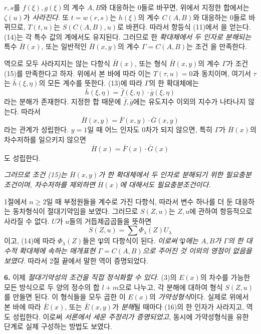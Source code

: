 \(r,s\)를 \(f(\xi),g(\xi)\)의 계수 \(A,B\)와 대응하는 0들로 바꾸면, 위에서 지정한 합에서는 \(\zeta(u)\)가 \emph{사라진다}. 또 \(t=w(r,s)\)는 \(h(\xi)\)의 계수 \(C(A,B)\)와 대응하는 0들로 바뀌므로, \(T(t,u)\)는 \(S(C(A,B),u)\)로 바뀐다. 따라서 항등식 (11)에서
을 얻는다. (14)는 각 특수 값의 계에서도 유지된다. 그러므로 한 \emph{확대체에서 두 인자로 분해되는} 특수 \(\bar H(x)\), 또는 일반적인 \(\bar H(x,y)\)의 계수 \(\Gamma=C(A,B)\)는 조건
을 만족한다.

역으로 모두 사라지지는 않는 다항식 \(\bar H(x)\), 또는 형식 \(\bar H(x,y)\)의 계수 \(\Gamma\)가 조건 (15)를 만족한다고 하자. 위에서 본 바에 따라 이는 \(T(\tau,u)=0\)과 동치이며, 여기서 \(\tau\)는 \(\bar h(\xi,\eta)\)의 모든 계수를 뜻한다. (13)에 따라 \(\Gamma\)의 한 확대체에는
\[
\bar h(\xi,\eta)=\bar f(\xi,\eta)\cdot\bar g(\xi,\eta)
\]
라는 분해가 존재한다. 지정한 합 때문에 \(\bar f,\bar g\)에는 유도지수 이외의 지수가 나타나지 않는다. 따라서
\[
\bar H(x,y)=\bar F(x,y)\cdot\bar G(x,y)
\]
라는 관계가 성립한다. \(y=1\)일 때 어느 인자도 0차가 되지 않으면, 특히 \(\Gamma\)가 \(\bar H(x)\)의 차수저하를 일으키지 않으면
\[
\bar H(x)=\bar F(x)\cdot\bar G(x)
\]
도 성립한다.

\emph{그러므로 조건 (15)는 \(\bar H(x,y)\)가 한 확대체에서 두 인자로 분해되기 위한 필요충분조건이며, 차수저하를 제외하면 \(\bar H(x)\)에 대해서도 필요충분조건이다.}

1절에서 \(n\ge2\)일 때 부정원들을 계수로 가진 다항식, 따라서 변수 하나를 더 둔 대응하는 동차형식이 절대기약임을 보였다. 그러므로 \(S(Z,u)\)는 \(Z,u\)에 관하여 항등적으로 사라질 수 없다. \(U\)가 \(u\)들의 거듭제곱곱들을 뜻하면
\[
S(Z,u)=\sum \Phi_\lambda(Z)U_\lambda
\]
이고, (14)에 따라 \(\Phi_\lambda(Z)\)들은 \(\mathfrak P\)의 다항식이 된다. \emph{이로써 \(\mathfrak P\)에는 \(A,B\)가 \(\Gamma\)의 한 대수적 확대체에 속하는 매개표현 \(\Gamma=C(A,B)\)으로 주어진 것 이외의 영점이 없음을 보였다.} 따라서 2절 끝에서 말한 역이 증명되었다.

\textbf{6.} 이제 \emph{절대기약성의 조건을 직접 정식화할 수 있다.} (3)의 \(E(x)\)의 차수를 가능한 모든 방식으로 두 양의 정수의 합 \(l+m\)으로 나누고, 각 분해에 대하여 형식 \(S(Z,u)\)를 만들면 된다. 이 형식들을 모두 곱한
이 \(E(x)\)의 \emph{가약성형식}이다. 실제로 위에서 본 바에 따라 \(\bar E(x)\), 또는 \(\bar E(x,y)\)가 \emph{분해}될 때마다 (16)의 한 인자가 사라지고, 역도 성립한다. 이로써 \emph{서론에서 세운 주정리가 증명되었고}, 동시에 가약성형식을 유한 단계로 실제 구성하는 방법도 보였다.

